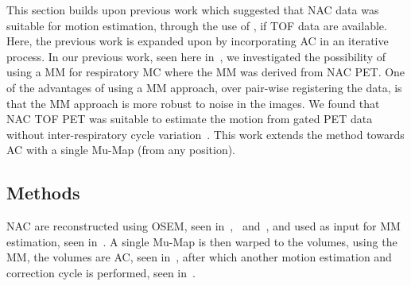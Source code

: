             This section builds upon previous work which suggested that \gls{NAC} data was suitable for motion estimation, through the use of , if \gls{TOF} data are available. Here, the previous work is expanded upon by incorporating \gls{AC} in an iterative process. In our previous work, seen here in~, we investigated the possibility of using a \gls{MM} for respiratory \gls{MC} where the \gls{MM} was derived from \gls{NAC} \gls{PET}. One of the advantages of using a \gls{MM} approach, over pair-wise registering the data, is that the \gls{MM} approach is more robust to noise in the images. We found that \gls{NAC} \gls{TOF} \gls{PET} was suitable to estimate the motion from gated \gls{PET} data without inter-respiratory cycle variation~. This work extends the method towards \gls{AC} with a single \gls{Mu-Map} (from any position).
        
        \subsection{Methods} \label{sec:pet_ct_respiratory_motion_correction_with_a_single_attenuation_map_using_nac_derived_deformation_fields_methods}
            \gls{NAC} are reconstructed using \gls{OSEM}, seen in~,~ and~, and used as input for \gls{MM} estimation, seen in~. A single \gls{Mu-Map} is then warped to the volumes, using the \gls{MM}, the volumes are \gls{AC}, seen in~, after which another motion estimation and correction cycle is performed, seen in~.
            
